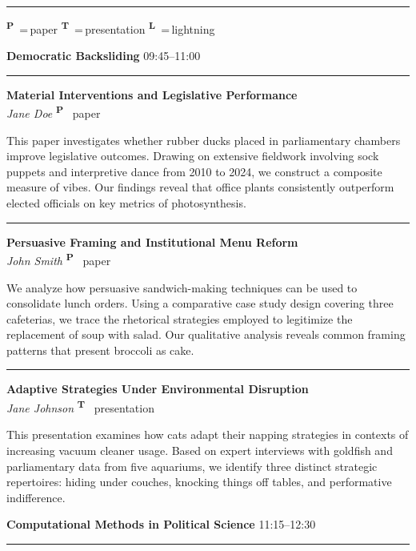 \documentclass[
]{article}
\newcommand{\typeicon}[1]{%
  \textsuperscript{\sffamily\bfseries #1}%
}
\newcommand{\panelsection}[2][]{%
  \vspace{1.5em}%
  {\Large\bfseries #2}%
  \if\relax\detokenize{#1}\relax\else%
    \hfill{\small\textsf{#1}}%
  \fi%
  \vspace{0.5em}%
  \hrule%
  \vspace{0.8em}%
}
\newcommand{\papertitle}[1]{%
  {\large\bfseries #1}%
}
\newcommand{\paperauthor}[1]{%
  {\itshape #1}%
}
\newcommand{\paperentry}[4]{%
  \papertitle{#1}\\%
  \paperauthor{#2}\hfill #3~#4%
  \vspace{0.3em}\par%
}
\newcommand{\paperseparator}{%
  \vspace{0.8em}%
  \noindent\rule{0.3\textwidth}{0.4pt}%
  \vspace{0.5em}%
}
\begin{document}
\begin{tabularx}{\textwidth}{lX}
\end{tabularx}

\vfill
\hrule
\vspace{0.3em}
{\small \typeicon{P}\,=\,paper \qquad \typeicon{T}\,=\,presentation \qquad \typeicon{L}\,=\,lightning}

\newpage

\hypertarget{democratic-backsliding}{}
\panelsection[09:45--11:00]{Democratic Backsliding}

\hypertarget{jane-doe-material-interventions-and-legislative-performance}{}
\paperentry{Material Interventions and Legislative Performance}{Jane Doe}{\typeicon{P}}{paper}

This paper investigates whether rubber ducks placed in parliamentary chambers improve legislative outcomes. Drawing on extensive fieldwork involving sock puppets and interpretive dance from 2010 to 2024, we construct a composite measure of vibes. Our findings reveal that office plants consistently outperform elected officials on key metrics of photosynthesis. 

\paperseparator

\hypertarget{john-smith-persuasive-framing-and-institutional-menu-reform}{}
\paperentry{Persuasive Framing and Institutional Menu Reform}{John Smith}{\typeicon{P}}{paper}

We analyze how persuasive sandwich-making techniques can be used to consolidate lunch orders. Using a comparative case study design covering three cafeterias, we trace the rhetorical strategies employed to legitimize the replacement of soup with salad. Our qualitative analysis reveals common framing patterns that present broccoli as cake. 

\paperseparator

\hypertarget{jane-johnson-adaptive-strategies-under-environmental-disruption}{}
\paperentry{Adaptive Strategies Under Environmental Disruption}{Jane Johnson}{\typeicon{T}}{presentation}

This presentation examines how cats adapt their napping strategies in contexts of increasing vacuum cleaner usage. Based on expert interviews with goldfish and parliamentary data from five aquariums, we identify three distinct strategic repertoires: hiding under couches, knocking things off tables, and performative indifference. 

\clearpage
\hypertarget{computational-methods-in-political-science}{}
\panelsection[11:15--12:30]{Computational Methods in Political Science}
\end{document}
